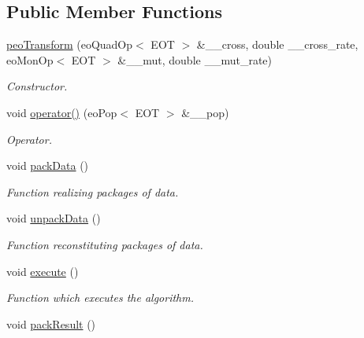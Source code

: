 \subsection*{Public Member Functions}
\begin{CompactItemize}
\item 
\hyperlink{classpeoTransform_755989a2d080903d0cade75643de0788}{peo\-Transform} (eo\-Quad\-Op$<$ EOT $>$ \&\_\-\_\-cross, double \_\-\_\-cross\_\-rate, eo\-Mon\-Op$<$ EOT $>$ \&\_\-\_\-mut, double \_\-\_\-mut\_\-rate)
\begin{CompactList}\small\item\em Constructor. \item\end{CompactList}\item 
void \hyperlink{classpeoTransform_9322aa28ad272289132e342624a0adb4}{operator()} (eo\-Pop$<$ EOT $>$ \&\_\-\_\-pop)
\begin{CompactList}\small\item\em Operator. \item\end{CompactList}\item 
\hypertarget{classpeoTransform_c1101d10a36ce4255b874bcd9725021e}{
void \hyperlink{classpeoTransform_c1101d10a36ce4255b874bcd9725021e}{pack\-Data} ()}
\label{classpeoTransform_c1101d10a36ce4255b874bcd9725021e}

\begin{CompactList}\small\item\em Function realizing packages of data. \item\end{CompactList}\item 
\hypertarget{classpeoTransform_a804631492e08053162a196877587aef}{
void \hyperlink{classpeoTransform_a804631492e08053162a196877587aef}{unpack\-Data} ()}
\label{classpeoTransform_a804631492e08053162a196877587aef}

\begin{CompactList}\small\item\em Function reconstituting packages of data. \item\end{CompactList}\item 
\hypertarget{classpeoTransform_85c2cbc76f803b2b5cb2bc8cbc214136}{
void \hyperlink{classpeoTransform_85c2cbc76f803b2b5cb2bc8cbc214136}{execute} ()}
\label{classpeoTransform_85c2cbc76f803b2b5cb2bc8cbc214136}

\begin{CompactList}\small\item\em Function which executes the algorithm. \item\end{CompactList}\item 
\hypertarget{classpeoTransform_bdae056027406ba9f489e2bef115fd08}{
void \hyperlink{classpeoTransform_bdae056027406ba9f489e2bef115fd08}{pack\-Result} ()}
\label{classpeoTransform_bdae056027406ba9f489e2bef115fd08}


\end{CompactItemize}
